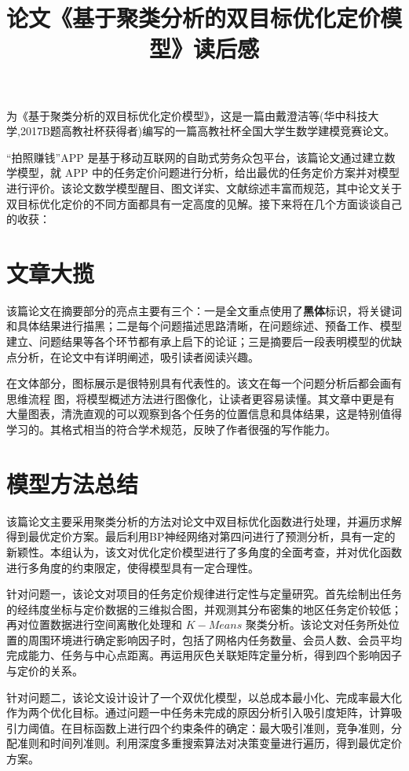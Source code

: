 \documentclass{whutmod}
\title{论文《基于聚类分析的双目标优化定价模型》读后感}
\begin{document}
	

\Large   
为《基于聚类分析的双目标优化定价模型》，这是一篇由戴澄洁等(华中科技大学,2017B题高教社杯获得者)编写的一篇高教社杯全国大学生数学建模竞赛论文。

“拍照赚钱”APP 是基于移动互联网的自助式劳务众包平台，该篇论文通过建立数学模型，就 APP 中的任务定价问题进行分析，给出最优的任务定价方案并对模型进行评价。该论文数学模型醒目、图文详实、文献综述丰富而规范，其中论文关于双目标优化定价的不同方面都具有一定高度的见解。接下来将在几个方面谈谈自己的收获：

\section{文章大揽}


该篇论文在摘要部分的亮点主要有三个：一是全文重点使用了\textbf{黑体}标识，将关键词和具体结果进行描黑；二是每个问题描述思路清晰，在问题综述、预备工作、模型建立、问题结果等各个环节都有承上启下的论证；三是摘要后一段表明模型的优缺点分析，在论文中有详明阐述，吸引读者阅读兴趣。

在文体部分，图标展示是很特别具有代表性的。该文在每一个问题分析后都会画有思维流程 图，将模型概述方法进行图像化，让读者更容易读懂。其文章中更是有大量图表，清洗直观的可以观察到各个任务的位置信息和具体结果，这是特别值得学习的。其格式相当的符合学术规范，反映了作者很强的写作能力。

\section{模型方法总结}
该篇论文主要采用聚类分析的方法对论文中双目标优化函数进行处理，并遍历求解得到最优定价方案。最后利用BP神经网络对第四问进行了预测分析，具有一定的新颖性。本组认为，该文对优化定价模型进行了多角度的全面考查，并对优化函数进行多角度的约束限定，使得模型具有一定合理性。

针对问题一，该论文对项目的任务定价规律进行定性与定量研究。首先绘制出任务的经纬度坐标与定价数据的三维拟合图，并观测其分布密集的地区任务定价较低；再对位置数据进行空间离散化处理和 $K-Means$ 聚类分析。该论文对任务所处位置的周围环境进行确定影响因子时，包括了网格内任务数量、会员人数、会员平均完成能力、任务与中心点距离。再运用灰色关联矩阵定量分析，得到四个影响因子与定价的关系。

针对问题二，该论文设计设计了一个双优化模型，以总成本最小化、完成率最大化作为两个优化目标。通过问题一中任务未完成的原因分析引入吸引度矩阵，计算吸引力阈值。在目标函数上进行四个约束条件的确定：最大吸引准则，竞争准则，分配准则和时间列准则。利用深度多重搜索算法对决策变量进行遍历，得到最优定价方案。
\end{document}
